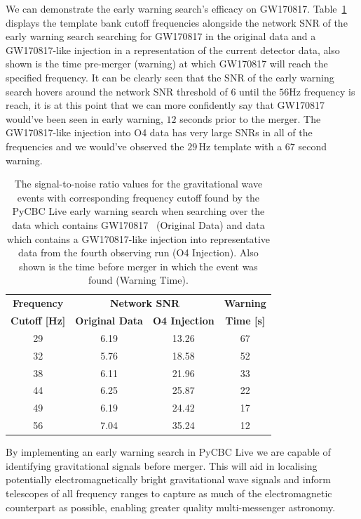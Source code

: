 We can demonstrate the early warning search's efficacy on GW170817. Table~\ref{6:tab:gw170817_early_warning} displays the template bank cutoff frequencies alongside the network SNR of the early warning search searching for GW170817 in the original data and a GW170817-like injection in a representation of the current detector data, also shown is the time pre-merger (warning) at which GW170817 will reach the specified frequency. It can be clearly seen that the SNR of the early warning search hovers around the network SNR threshold of $6$ until the $56$Hz frequency is reach, it is at this point that we can more confidently say that GW170817 would've been seen in early warning, $12$ seconds prior to the merger. The GW170817-like injection into O4 data has very large SNRs in all of the frequencies and we would've observed the $29 \, \text{Hz}$ template with a $67$ second warning.
%
\begin{table}[ht]
    \centering
    \setlength{\tabcolsep}{4pt}
    \begin{tabular}{cccc}
        \toprule
        \multicolumn{1}{c}{\textbf{Frequency}} & \multicolumn{2}{c}{\textbf{Network SNR}} & \multicolumn{1}{c}{\textbf{Warning}} \\
        \cmidrule(lr){1-4}
        \textbf{Cutoff [Hz]} & \textbf{Original Data} & \textbf{O4 Injection} & \textbf{Time [s]} \\
        \midrule
        29 & 6.19 & 13.26 & 67 \\
        32 & 5.76 & 18.58 & 52 \\
        38 & 6.11 & 21.96 & 33 \\
        44 & 6.25 & 25.87 & 22 \\
        49 & 6.19 & 24.42 & 17 \\
        56 & 7.04 & 35.24 & 12 \\
        \bottomrule
    \end{tabular}
    \caption{The signal-to-noise ratio values for the gravitational wave events with corresponding frequency cutoff found by the PyCBC Live early warning search when searching over the data which contains GW170817~\cite{GW170817:2017} (Original Data) and data which contains a GW170817-like injection into representative data from the fourth observing run (O4 Injection). Also shown is the time before merger in which the event was found (Warning Time).}
    \label{6:tab:gw170817_early_warning}
\end{table}
%
By implementing an early warning search in PyCBC Live we are capable of identifying gravitational signals before merger. This will aid in localising potentially electromagnetically bright gravitational wave signals and inform telescopes of all frequency ranges to capture as much of the electromagnetic counterpart as possible, enabling greater quality multi-messenger astronomy.


